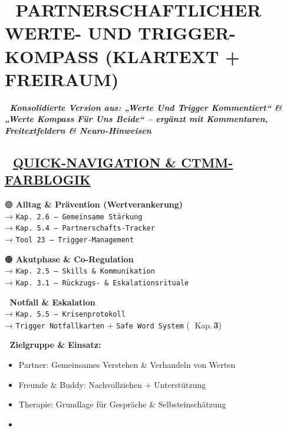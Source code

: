 %


\hypertarget{partnerschaftlicher-werte--und-trigger-kompass-klartext-freiraum}{%
\section{\texorpdfstring{💞 \textbf{PARTNERSCHAFTLICHER WERTE- UND TRIGGER-KOMPASS (KLARTEXT + FREIRAUM)}}{💞 PARTNERSCHAFTLICHER WERTE- UND TRIGGER-KOMPASS (KLARTEXT + FREIRAUM)}}\label{partnerschaftlicher-werte--und-trigger-kompass-klartext-freiraum}}

🧩 \emph{\textbf{Konsolidierte Version aus: „Werte Und Trigger Kommentiert`` \& „Werte Kompass Für Uns Beide`` -- ergänzt mit Kommentaren, Freitextfeldern \& Neuro-Hinweisen}}

\hypertarget{quick-navigation-ctmm-farblogik}{%
\subsection{\texorpdfstring{🔗 \textbf{\ul{QUICK-NAVIGATION \& CTMM-FARBLOGIK}}}{🔗 QUICK-NAVIGATION \& CTMM-FARBLOGIK}}\label{quick-navigation-ctmm-farblogik}}

🟢 \textbf{Alltag \& Prävention (Wertverankerung)}\\
→ \texttt{Kap.}\texttt{\,}\texttt{2.6\ }\texttt{–\ Gemeinsame\ Stärkung}\\
→ \texttt{Kap.}\texttt{\,}\texttt{5.4}\texttt{\ –\ Partnerschafts-Tracker}\\
→ \texttt{Tool\ 23\ }\texttt{–\ Trigger-Management}

🟠 \textbf{Akutphase \& Co-Regulation}\\
→ \texttt{Kap.}\texttt{\,}\texttt{2.5\ }\texttt{–\ Skills\ \&\ Kommunikation}\\
→ \texttt{Kap.}\texttt{\,}\texttt{3.1\ }\texttt{–\ Rückzugs-\ \&\ Eskalationsrituale}

🔴 \textbf{Notfall \& Eskalation}\\
→ \texttt{Kap.}\texttt{\,}\texttt{5.5\ }\texttt{–\ Krisenprotokoll}\\
→ \texttt{Trigger\ Notfallkarten} + \texttt{Safe\ Word\ System} (🔴 Kap.\,\textbf{3})

🧭 \textbf{Zielgruppe \& Einsatz:}

\begin{itemize}
\tightlist
\item
  Partner: Gemeinsames Verstehen \& Verhandeln von Werten
\item
  Freunde \& Buddy: Nachvollziehen + Unterstützung
\item
  Therapie: Grundlage für Gespräche \& Selbsteinschätzung
\item
\end{itemize}

